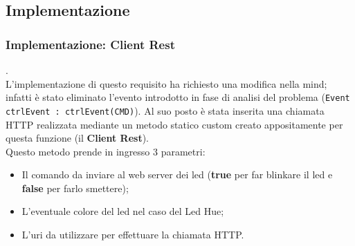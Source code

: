 \documentclass{llncs}
\begin{document}
\subsection{Implementazione}
\label{ImplementazioneReq4}

\subsubsection{Implementazione: Client Rest} .
\label{ImplementazioneReq4ClientRest}
\vspace*{1ex}
\\
L'implementazione di questo requisito ha richiesto una modifica nella mind; infatti \`e stato eliminato l'evento introdotto in fase di analisi del problema (\texttt{Event ctrlEvent : ctrlEvent(CMD)}). Al suo posto \`e stata inserita una chiamata HTTP realizzata mediante un metodo statico custom creato appositamente per questa funzione (il \textbf{Client Rest}). \\
Questo metodo prende in ingresso 3 parametri:
\begin{itemize}
    \item Il comando da inviare al web server dei led (\textbf{true} per far blinkare il led e \textbf{false} per farlo smettere);
    \item L'eventuale colore del led nel caso del Led Hue;
    \item L'uri da utilizzare per effettuare la chiamata HTTP.
\end{itemize}\\
\end{document}
